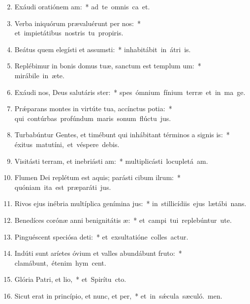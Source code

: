 \begin{flushleft}
\begin{enumerate}[leftmargin=*]
\setcounter{enumi}{1}

\item Exáudi oratiónem am:~* \mbox{ad te omnis ca et.}
\item Verba iniquórum prævaluérunt per nos:~* \mbox{et impietátibus nostris tu propiris.}
\item Beátus quem elegísti et assumsti:~* \mbox{inhabitábit in átri is.}
\item Replébimur in bonis domus tuæ, sanctum est templum um:~* \mbox{mirábile in æte.}
\item Exáudi nos, Deus salutáris ster:~* \mbox{spes ómnium fínium terræ et in ma ge.}
\item Pr\'{\ae}parans montes in virtúte tua, accínctus potia:~* \mbox{qui contúrbas profúndum maris sonum flúctu jus.}
\item Turbabúntur Gentes, et timébunt qui inhábitant términos a signis is:~* \mbox{éxitus matutíni, et véspere debis.}
\item Visitásti terram, et inebriásti am:~* \mbox{multiplicásti locupletá am.}
\item Flumen Dei replétum est aquis; parásti cibum ilrum:~* \mbox{quóniam ita est præparáti jus.}
\item Rivos ejus inébria multíplica genímina jus:~* \mbox{in stillicídiis ejus lætábi nans.}
\item Benedíces corónæ anni benignitátis æ:~* \mbox{et campi tui replebúntur ute.}
\item Pinguéscent speciósa deti:~* \mbox{et exsultatióne colles actur.}
\item Indúti sunt aríetes óvium et valles abundábunt fruto:~* \mbox{clamábunt, étenim hym cent.}
\item Glória Patri, et lio,~* \mbox{et Spirítu cto.}
\item Sicut erat in princípio, et nunc, et per,~* \mbox{et in s\'{\ae}cula sæculó. men.}

\end{enumerate}
\end{flushleft}

